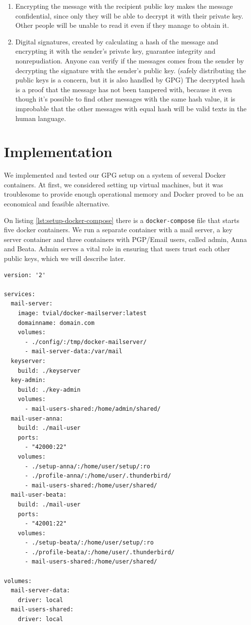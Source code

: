 \documentclass{classrep}
\newcommand\code[1]{\texttt{#1}}
\begin{document}
\begin{enumerate}
\item Encrypting the message with the recipient public key makes the message confidential, since only they
    will be able to decrypt it with their private key. Other people will be unable to read it even if they
    manage to obtain it.
\item Digital signatures, created by calculating a hash of the message and encrypting it with the sender's
    private key, guarantee integrity and nonrepudiation. Anyone can verify if the messages comes from
    the sender by decrypting the signature with the sender's public key. (safely distributing the public
    keys is a concern, but it is also handled by GPG) The decrypted hash is a proof that the message
    has not been tampered with, because it even though it's possible to find other messages with
    the same hash value, it is improbable that the other messages with equal hash will be valid 
    texts in the human language.
\end{enumerate}

\section{Implementation}

We implemented and tested our GPG setup on a system of several Docker containers. 
At first, we considered setting up virtual machines, but it was troublesome to provide
enough operational memory and Docker proved to be an economical and feasible alternative.

On listing \ref{lst:setup-docker-compose} there is a \code{docker-compose} file that starts five
docker containers. We run a separate container with a mail server, a key server container 
and three containers with PGP/Email users, called admin, Anna and Beata. Admin serves
a vital role in ensuring that users trust each other public keys, which we will describe later.

\begin{lstlisting}[label={lst:setup-docker-compose}, caption={Contents of docker-compose.yml file, orchestrating all containers.}]
version: '2'

services:
  mail-server:
    image: tvial/docker-mailserver:latest
    domainname: domain.com
    volumes:
      - ./config/:/tmp/docker-mailserver/
      - mail-server-data:/var/mail
  keyserver:
    build: ./keyserver
  key-admin:
    build: ./key-admin
    volumes:
      - mail-users-shared:/home/admin/shared/
  mail-user-anna:
    build: ./mail-user
    ports:
      - "42000:22"
    volumes:
      - ./setup-anna/:/home/user/setup/:ro
      - ./profile-anna/:/home/user/.thunderbird/
      - mail-users-shared:/home/user/shared/
  mail-user-beata:
    build: ./mail-user
    ports:
      - "42001:22"
    volumes:
      - ./setup-beata/:/home/user/setup/:ro
      - ./profile-beata/:/home/user/.thunderbird/
      - mail-users-shared:/home/user/shared/

volumes:
  mail-server-data:
    driver: local
  mail-users-shared:
    driver: local
\end{lstlisting}
\end{document}
